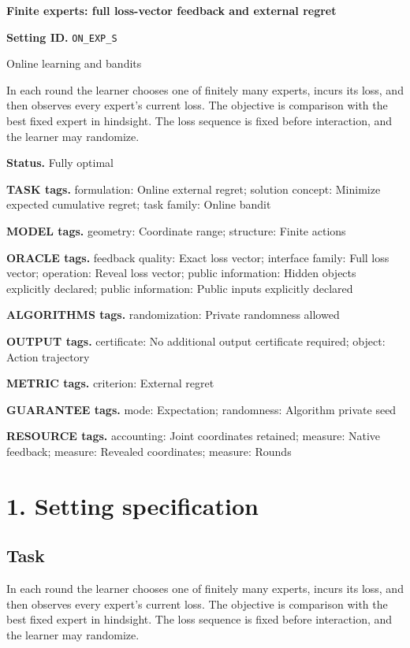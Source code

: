 \documentclass[10pt,a4paper]{article}
\begin{document}
\raggedright

{\LARGE\bfseries\sffamily\color{AtlasNavy} Finite experts: full loss-vector feedback and external regret\par}\vspace{5pt}
\textbf{Setting ID.} \texttt{ON\_\allowbreak{}EXP\_\allowbreak{}S}

Online learning and bandits

In each round the learner chooses one of finitely many experts, incurs its loss, and then observes every expert's current loss. The objective is comparison with the best fixed expert in hindsight. The loss sequence is fixed before interaction, and the learner may randomize.

\textbf{Status.} Fully optimal

\textbf{TASK tags.} formulation: Online external regret; solution concept: Minimize expected cumulative regret; task family: Online bandit

\textbf{MODEL tags.} geometry: Coordinate range; structure: Finite actions

\textbf{ORACLE tags.} feedback quality: Exact loss vector; interface family: Full loss vector; operation: Reveal loss vector; public information: Hidden objects explicitly declared; public information: Public inputs explicitly declared

\textbf{ALGORITHMS tags.} randomization: Private randomness allowed

\textbf{OUTPUT tags.} certificate: No additional output certificate required; object: Action trajectory

\textbf{METRIC tags.} criterion: External regret

\textbf{GUARANTEE tags.} mode: Expectation; randomness: Algorithm private seed

\textbf{RESOURCE tags.} accounting: Joint coordinates retained; measure: Native feedback; measure: Revealed coordinates; measure: Rounds

\section{1. Setting specification}
\subsection{Task}
In each round the learner chooses one of finitely many experts, incurs its loss, and then observes every expert's current loss. The objective is comparison with the best fixed expert in hindsight. The loss sequence is fixed before interaction, and the learner may randomize.
\end{document}
